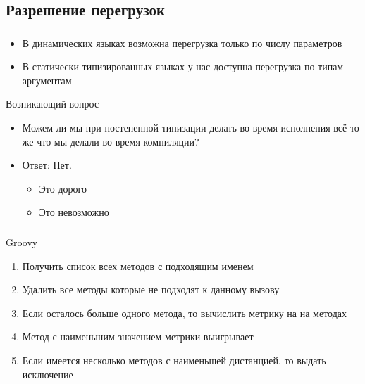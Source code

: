 \documentclass[t]{beamer}  %
\begin{document}
\subsection{Разрешение перегрузок}
\begin{frame}
	\frametitle{\insertsection} 
  	\framesubtitle{\insertsubsection}
	\begin{itemize}
       \item В динамических языках возможна перегрузка только по числу параметров
       \item В статически типизированных языках у нас доступна перегрузка по типам аргументам
    \end{itemize}
    \begin{block}{Возникающий вопрос}
		\begin{itemize}
          \item Можем ли мы при постепенной типизации делать во время исполнения всё то же что мы делали во время компиляции?
          \item<2> Ответ: Нет.
          		\begin{itemize}
                	\item Это дорого
                    \item Это невозможно
                \end{itemize}
		\end{itemize}
	\end{block}
\end{frame}

	
\begin{frame}
	\frametitle{\insertsection} 
  	\framesubtitle{\insertsubsection}
    \begin{block}{Groovy}
		\begin{enumerate}
			\item  Получить список всех методов с подходящим именем
			\item  Удалить все методы которые не подходят к данному вызову
			\item  Если осталось больше одного метода, то вычислить метрику на на методах
			\item  Метод с наименьшим значением метрики выигрывает
			\item  Если имеется несколько методов с наименьшей дистанцией, то выдать исключение
		\end{enumerate}
	\end{block}
\end{frame}
\end{document}
